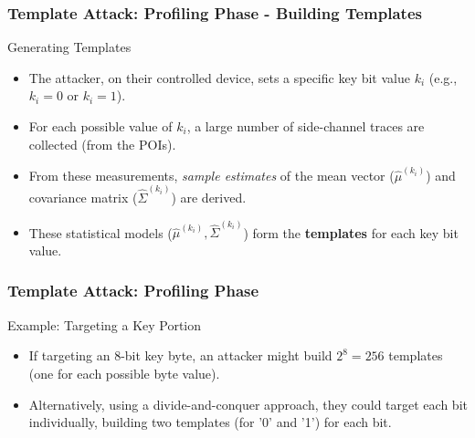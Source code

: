 \begin{frame}
    \frametitle{Template Attack: Profiling Phase - Building Templates} 
    \begin{block}{Generating Templates}
        \begin{itemize}
            \item The attacker, on their controlled device, sets a specific key bit value $k_i$ (e.g., $k_i=0$ or $k_i=1$).
            \item For each possible value of $k_i$, a large number of side-channel traces are collected (from the POIs).
            \item From these measurements, \textit{sample estimates} of the mean vector ($\hat{\mu}^{(k_i)}$) and covariance matrix ($\hat{\Sigma}^{(k_i)}$) are derived.
            \item These statistical models ($\hat{\mu}^{(k_i)}, \hat{\Sigma}^{(k_i)}$) form the \textbf{templates} for each key bit value.
        \end{itemize}
    \end{block}
\end{frame}

\begin{frame}
    \frametitle{Template Attack: Profiling Phase}
    \begin{block}{Example: Targeting a Key Portion}
        \begin{itemize}
            \item If targeting an 8-bit key byte, an attacker might build $2^8 = 256$ templates (one for each possible byte value).
            \item Alternatively, using a divide-and-conquer approach, they could target each bit individually, building two templates (for '0' and '1') for each bit.
        \end{itemize}
    \end{block}
\end{frame}

